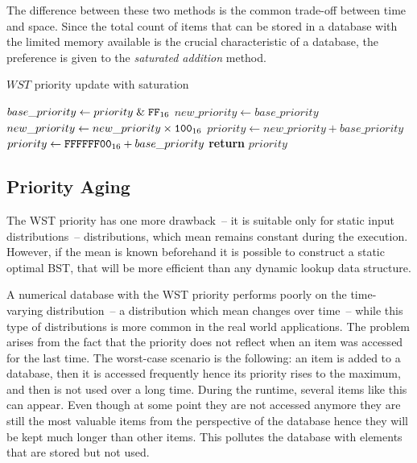 The difference between these two methods is the common trade-off between time and space. Since the total count of items that can be stored in a database with the limited memory available is the crucial characteristic of a database, the preference is given to the \emph{saturated addition} method.
\begin{algorithm}
\caption{$WST$ priority update with saturation}\label{alg:wst_priority2}
\begin{algorithmic}[1]
    \State $base\_priority\gets priority \mathrel{\&} \texttt{FF}_{16}$
    \State $new\_priority\gets base\_priority$
    \State $new\_priority \gets new\_priority \times \texttt{100}_{16}$
    \State{}
      \State $priority \gets new\_priority + base\_priority$
    \Else
      \State $priority \gets \texttt{FFFFFF00}_{16} + base\_priority$
    \EndIf
    \State \textbf{return} $priority$
  \EndProcedure
\end{algorithmic}
\end{algorithm}

\subsection{Priority Aging}
The WST priority has one more drawback~-- it is suitable only for static input distributions~-- distributions, which mean remains constant during the execution. However, if the mean is known beforehand it is possible to construct a static optimal BST\cite[p.~442]{knuth3}, that will be more efficient than any dynamic lookup data structure.

A numerical database with the WST priority performs poorly on the time-varying distribution~-- a distribution which mean changes over time~-- while this type of distributions is more common in the real world applications. The problem arises from the fact that the priority does not reflect when an item was accessed for the last time. The worst-case scenario is the following: an item is added to a database, then it is accessed frequently hence its priority rises to the maximum, and then is not used over a long time. During the runtime, several items like this can appear. Even though at some point they are not accessed anymore they are still the most valuable items from the perspective of the database hence they will be kept much longer than other items. This pollutes the database with elements that are stored but not used.

